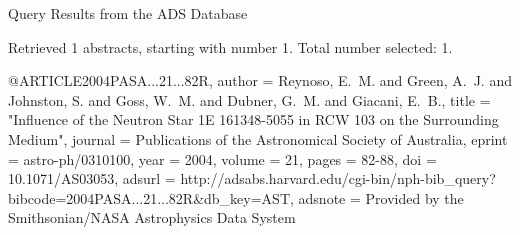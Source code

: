 Query Results from the ADS Database


Retrieved 1 abstracts, starting with number 1.  Total number selected: 1.

@ARTICLE{2004PASA...21...82R,
   author = {{Reynoso}, E.~M. and {Green}, A.~J. and {Johnston}, S. and {Goss}, W.~M. and 
	{Dubner}, G.~M. and {Giacani}, E.~B.},
    title = "{Influence of the Neutron Star 1E 161348-5055 in RCW 103 on the Surrounding Medium}",
  journal = {Publications of the Astronomical Society of Australia},
   eprint = {astro-ph/0310100},
     year = 2004,
   volume = 21,
    pages = {82-88},
      doi = {10.1071/AS03053},
   adsurl = {http://adsabs.harvard.edu/cgi-bin/nph-bib_query?bibcode=2004PASA...21...82R&db_key=AST},
  adsnote = {Provided by the Smithsonian/NASA Astrophysics Data System}
}


